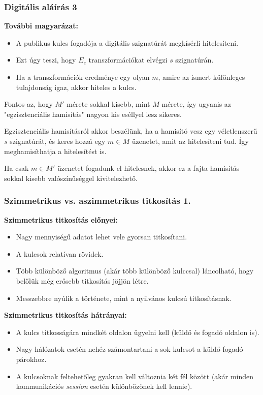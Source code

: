 \documentclass{beamer}
\begin{document}
\begin{frame}
    \frametitle{Digitális aláírás 3}

    \textbf{További magyarázat:}

    \begin{itemize}
        \item A publikus kulcs fogadója a digitális szignatúrát megkísérli hitelesíteni.
        \item Ezt úgy teszi, hogy $E_e$ transzformációkat elvégzi $s$ szignatúrán.
        \item Ha a transzformációk eredménye egy olyan $m$, amire az ismert különleges tulajdonság igaz, akkor hiteles a kulcs.
    \end{itemize}

    Fontos az, hogy $M'$ mérete sokkal kisebb, mint $M$ mérete, így ugyanis az "egzisztenciális hamisítás" nagyon kis eséllyel
    lesz sikeres.

    Egzisztenciális hamisításról akkor beszélünk, ha a hamisító vesz egy véletlenszerű $s$ szignatúrát, és keres hozzá egy
    $m \in M$ üzenetet, amit az hitelesíteni tud. Így meghamisíthatja a hitelesítést is.

    Ha csak $m \in M'$ üzenetet fogadunk el hitelesnek, akkor ez a fajta hamisítás sokkal kisebb valószínűséggel kivitelezhető.
\end{frame}

\begin{frame}
    \frametitle{Szimmetrikus vs. aszimmetrikus titkosítás 1.}

    \textbf{Szimmetrikus titkosítás előnyei:}
    \begin{itemize}
        \item Nagy mennyiségű adatot lehet vele gyorsan titkosítani.
        \item A kulcsok relatívan rövidek.
        \item Több különböző algoritmus (akár több különböző kulccsal) láncolható, hogy belőlük még erősebb titkosítás
              jöjjön létre.
        \item Messzebbre nyúlik a története, mint a nyilvános kulcsú titkosításnak.
    \end{itemize}

    \textbf{Szimmetrikus titkosítás hátrányai:}
    \begin{itemize}
        \item A kulcs titkosságára mindkét oldalon ügyelni kell (küldő és fogadó oldalon is).
        \item Nagy hálózatok esetén nehéz számontartani a sok kulcsot a küldő-fogadó párokhoz.
        \item A kulcsoknak feltehetőleg gyakran kell változnia két fél között (akár minden kommunikációs \textit{session}
              esetén különbözőnek kell lennie).
    \end{itemize}
\end{frame}
\end{document}
